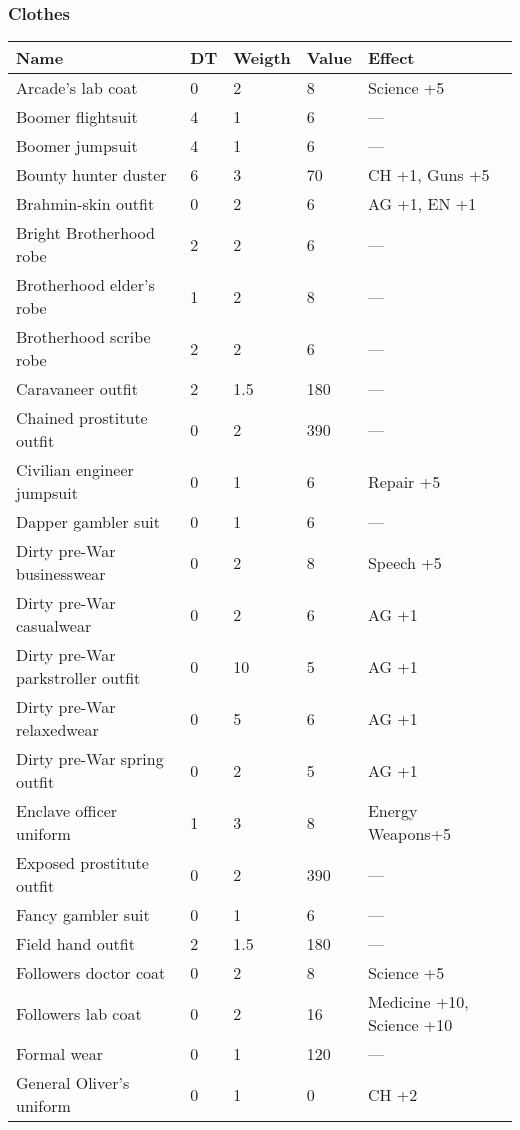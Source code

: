
\subsubsection{Clothes}
\begin{longtable}{|p{4cm}|p{1.2cm}|p{1.2cm}|p{1.2cm}|p{4cm}|}
\hline
\bfseries Name & \bfseries DT & \bfseries Weigth & \bfseries Value & \bfseries Effect \\
\hline
\endhead
Arcade's lab coat & 0 & 2 & 8 & Science +5 \\
Boomer flightsuit & 4 & 1 & 6 & — \\
Boomer jumpsuit & 4 & 1 & 6 & — \\
Bounty hunter duster & 6 & 3 & 70 & CH +1, Guns +5 \\
Brahmin-skin outfit & 0 & 2 & 6 & AG +1, EN +1 \\
Bright Brotherhood robe & 2 & 2 & 6 & — \\
Brotherhood elder's robe & 1 & 2 & 8 & — \\
Brotherhood scribe robe & 2 & 2 & 6 & — \\
Caravaneer outfit & 2 & 1.5 & 180 & — \\
Chained prostitute outfit & 0 & 2 & 390 & — \\
Civilian engineer jumpsuit & 0 & 1 & 6 & Repair +5 \\
Dapper gambler suit & 0 & 1 & 6 & — \\
Dirty pre-War businesswear & 0 & 2 & 8 & Speech +5 \\
Dirty pre-War casualwear & 0 & 2 & 6 & AG +1 \\
Dirty pre-War parkstroller outfit & 0 & 10 & 5 & AG +1 \\
Dirty pre-War relaxedwear & 0 & 5 & 6 & AG +1 \\
Dirty pre-War spring outfit & 0 & 2 & 5 & AG +1 \\
Enclave officer uniform & 1 & 3 & 8 & Energy Weapons+5 \\
Exposed prostitute outfit & 0 & 2 & 390 & — \\
Fancy gambler suit & 0 & 1 & 6 & — \\
Field hand outfit & 2 & 1.5 & 180 & — \\
Followers doctor coat & 0 & 2 & 8 & Science +5 \\
Followers lab coat & 0 & 2 & 16 & Medicine +10, Science +10 \\
Formal wear & 0 & 1 & 120 & — \\
General Oliver's uniform & 0 & 1 & 0 & CH +2 \\

\end{longtable}
